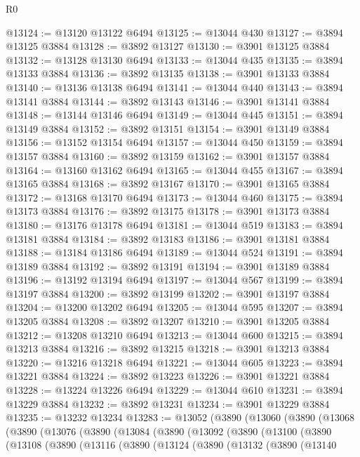 \begin{lexlean}{R0}
\begin{coremodule}
@13124 := @13120 @13122 @6494
@13125 := @13044 @430
@13127 := @3894 @13125 @3884
@13128 := @3892 @13127
@13130 := @3901 @13125 @3884
@13132 := @13128 @13130 @6494
@13133 := @13044 @435
@13135 := @3894 @13133 @3884
@13136 := @3892 @13135
@13138 := @3901 @13133 @3884
@13140 := @13136 @13138 @6494
@13141 := @13044 @440
@13143 := @3894 @13141 @3884
@13144 := @3892 @13143
@13146 := @3901 @13141 @3884
@13148 := @13144 @13146 @6494
@13149 := @13044 @445
@13151 := @3894 @13149 @3884
@13152 := @3892 @13151
@13154 := @3901 @13149 @3884
@13156 := @13152 @13154 @6494
@13157 := @13044 @450
@13159 := @3894 @13157 @3884
@13160 := @3892 @13159
@13162 := @3901 @13157 @3884
@13164 := @13160 @13162 @6494
@13165 := @13044 @455
@13167 := @3894 @13165 @3884
@13168 := @3892 @13167
@13170 := @3901 @13165 @3884
@13172 := @13168 @13170 @6494
@13173 := @13044 @460
@13175 := @3894 @13173 @3884
@13176 := @3892 @13175
@13178 := @3901 @13173 @3884
@13180 := @13176 @13178 @6494
@13181 := @13044 @519
@13183 := @3894 @13181 @3884
@13184 := @3892 @13183
@13186 := @3901 @13181 @3884
@13188 := @13184 @13186 @6494
@13189 := @13044 @524
@13191 := @3894 @13189 @3884
@13192 := @3892 @13191
@13194 := @3901 @13189 @3884
@13196 := @13192 @13194 @6494
@13197 := @13044 @567
@13199 := @3894 @13197 @3884
@13200 := @3892 @13199
@13202 := @3901 @13197 @3884
@13204 := @13200 @13202 @6494
@13205 := @13044 @595
@13207 := @3894 @13205 @3884
@13208 := @3892 @13207
@13210 := @3901 @13205 @3884
@13212 := @13208 @13210 @6494
@13213 := @13044 @600
@13215 := @3894 @13213 @3884
@13216 := @3892 @13215
@13218 := @3901 @13213 @3884
@13220 := @13216 @13218 @6494
@13221 := @13044 @605
@13223 := @3894 @13221 @3884
@13224 := @3892 @13223
@13226 := @3901 @13221 @3884
@13228 := @13224 @13226 @6494
@13229 := @13044 @610
@13231 := @3894 @13229 @3884
@13232 := @3892 @13231
@13234 := @3901 @13229 @3884
@13235 := @13232 @13234
@13283 := @13052
    (@3890
      (@13060
        (@3890
          (@13068
            (@3890
              (@13076
                (@3890
                  (@13084
                    (@3890
                      (@13092
                        (@3890
                          (@13100
                            (@3890
                              (@13108
                                (@3890
                                  (@13116
                                    (@3890
                                      (@13124
                                        (@3890
                                          (@13132
                                            (@3890
                                              (@13140

\end{coremodule}
\end{lexlean}
